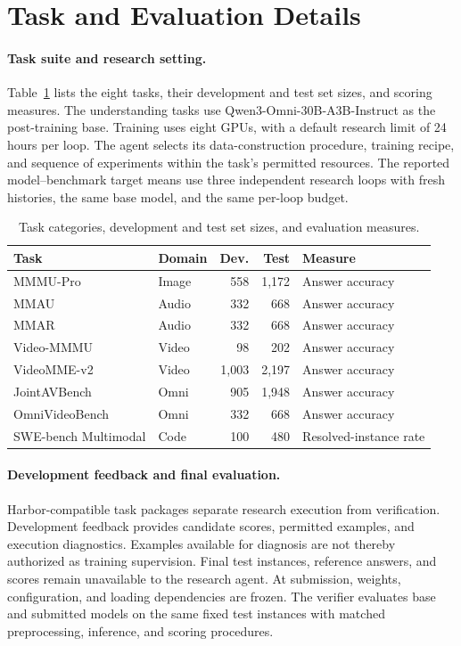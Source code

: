 \raggedbottom
\section{Task and Evaluation Details}
\label{app:protocols}

\paragraph{Task suite and research setting.}
Table~\ref{tab:appendix-tasks} lists the eight tasks, their development and test set sizes, and scoring measures. The understanding tasks use Qwen3-Omni-30B-A3B-Instruct as the post-training base. Training uses eight GPUs, with a default research limit of 24 hours per loop. The agent selects its data-construction procedure, training recipe, and sequence of experiments within the task's permitted resources. The reported model--benchmark target means use three independent research loops with fresh histories, the same base model, and the same per-loop budget.

\begin{table}[!htbp]
\miletablestyle
\caption{Task categories, development and test set sizes, and evaluation measures.}
\label{tab:appendix-tasks}
\begin{tabular*}{\linewidth}{@{\extracolsep{\fill}}llrrl@{}}
\toprule
Task & Domain & Dev. & Test & Measure \\
\midrule
MMMU-Pro & Image & 558 & 1,172 & Answer accuracy \\
MMAU & Audio & 332 & 668 & Answer accuracy \\
MMAR & Audio & 332 & 668 & Answer accuracy \\
Video-MMMU & Video & 98 & 202 & Answer accuracy \\
VideoMME-v2 & Video & 1,003 & 2,197 & Answer accuracy \\
JointAVBench & Omni & 905 & 1,948 & Answer accuracy \\
OmniVideoBench & Omni & 332 & 668 & Answer accuracy \\
SWE-bench Multimodal & Code & 100 & 480 & Resolved-instance rate \\
\bottomrule
\end{tabular*}
\end{table}

\paragraph{Development feedback and final evaluation.}
Harbor-compatible task packages separate research execution from verification. Development feedback provides candidate scores, permitted examples, and execution diagnostics. Examples available for diagnosis are not thereby authorized as training supervision. Final test instances, reference answers, and scores remain unavailable to the research agent. At submission, weights, configuration, and loading dependencies are frozen. The verifier evaluates base and submitted models on the same fixed test instances with matched preprocessing, inference, and scoring procedures.

